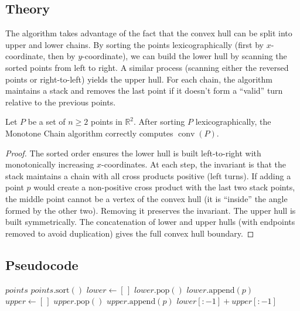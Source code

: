 \subsection{Theory}

The algorithm takes advantage of the fact that the convex hull can be split into upper and lower chains. By sorting the points lexicographically (first by $x$-coordinate, then by $y$-coordinate), we can build the lower hull by scanning the sorted points from left to right. A similar process (scanning either the reversed points or right-to-left) yields the upper hull. For each chain, the algorithm maintains a stack and removes the last point if it doesn't form a ``valid'' turn relative to the previous points.

\begin{theorem}\label{thm:monotone_chain_correctness}
Let $P$ be a set of $n \ge 2$ points in $\mathbb{R}^2$. After sorting $P$ lexicographically, the Monotone Chain algorithm correctly computes $\operatorname{conv}(P)$.
\end{theorem}
\begin{proof}
The sorted order ensures the lower hull is built left-to-right with monotonically increasing $x$-coordinates. At each step, the invariant is that the stack maintains a chain with all cross products positive (left turns). If adding a point $p$ would create a non-positive cross product with the last two stack points, the middle point cannot be a vertex of the convex hull (it is ``inside'' the angle formed by the other two). Removing it preserves the invariant. The upper hull is built symmetrically. The concatenation of lower and upper hulls (with endpoints removed to avoid duplication) gives the full convex hull boundary.
\end{proof}

\subsection{Pseudocode}

\begin{algorithm}[htbp]
\caption{Monotone Chain (Andrew's Algorithm)}
\label{alg:monotone_chain}
\begin{algorithmic}[1]
    \State \Return $points$
  \EndIf
  \State $points.\text{sort}()$
  \State $lower \gets [\,]$
      \State $lower.\text{pop}()$
    \EndWhile
    \State $lower.\text{append}(p)$
  \EndFor
  \State $upper \gets [\,]$
      \State $upper.\text{pop}()$
    \EndWhile
    \State $upper.\text{append}(p)$
  \EndFor
  \State \Return $lower[:-1] + upper[:-1]$
\EndFunction
\end{algorithmic}
\end{algorithm}

